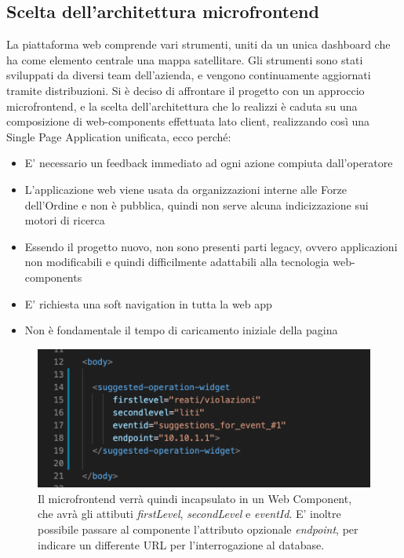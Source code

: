 \subsection{Scelta dell'architettura microfrontend}
La piattaforma web comprende vari strumenti, uniti da un unica dashboard che ha come elemento centrale una 
mappa satellitare. Gli strumenti sono stati sviluppati da diversi team dell'azienda, e vengono continuamente
aggiornati tramite distribuzioni. Si è deciso di affrontare il progetto con un approccio microfrontend,
e la scelta dell'architettura che lo realizzi è caduta su una composizione di web-components effettuata
lato client, realizzando così una Single Page Application unificata, ecco perché:
\begin{itemize}
    \item E' necessario un feedback immediato ad ogni azione compiuta dall'operatore
    \item L'applicazione web viene usata da organizzazioni interne alle Forze dell'Ordine 
    e non è pubblica, quindi non serve alcuna indicizzazione sui motori di ricerca
    \item Essendo il progetto nuovo, non sono presenti parti legacy, ovvero applicazioni non modificabili e quindi 
 difficilmente adattabili alla tecnologia web-components
    \item E' richiesta una soft navigation in tutta la web app
    \item Non è fondamentale il tempo di caricamento iniziale della pagina 
\end{itemize}

\begin{figure}[H]
    \centering
    \includegraphics[width=140mm]{img/componentehtml.png}
    \caption{Il microfrontend verrà quindi incapsulato in un Web Component, che avrà gli attibuti \emph{firstLevel}, \emph{secondLevel} e \emph{eventId}.
    E' inoltre possibile passare al componente l'attributo opzionale \emph{endpoint}, per indicare un differente URL per l'interrogazione al database.
    }
  \end{figure}

